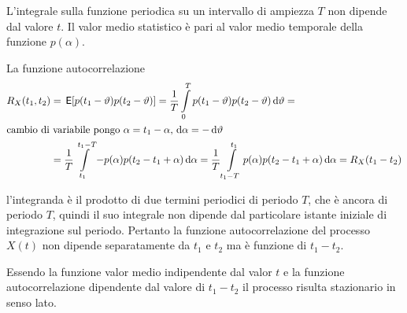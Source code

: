L'integrale sulla funzione periodica su un intervallo di ampiezza $T$ non dipende dal valore $t$. Il valor medio statistico è pari al valor medio temporale della funzione $p(\alpha)$.

La funzione autocorrelazione
\begin{align*}
	R_X(t_1,t_2)&=\,{\operatorname{\mathsf{E}}}\!\left[{p(t_1-\vartheta)p(t_2-\vartheta)}\right]=\frac{1}{T}\int\limits_{0}^{T}{p(t_1-\vartheta)p(t_2-\vartheta)}{\,\mathop{}\!\mathrm{d}{\vartheta}}=\\
\intertext{cambio di variabile pongo $\alpha=t_1-\alpha$, $\mathop{}\!\mathrm{d}\alpha=-\mathop{}\!\mathrm{d}\vartheta$}
	&=\frac{1}{T}\int\limits_{t_1}^{t_1-T}{-p(\alpha)p(t_2-t_1+\alpha)}{\,\mathop{}\!\mathrm{d}{\alpha}}=\frac{1}{T}\int\limits_{t_1-T}^{t_1}{p(\alpha)p(t_2-t_1+\alpha)}{\,\mathop{}\!\mathrm{d}{\alpha}}=R_X(t_1-t_2)
\end{align*}

l'integranda è il prodotto di due termini periodici di periodo $T$, che è ancora di periodo $T$, quindi il suo integrale non dipende dal particolare istante iniziale di integrazione sul periodo. Pertanto la funzione autocorrelazione del processo $X(t)$ non dipende separatamente da $t_1$ e $t_2$ ma è funzione di $t_1-t_2$.

Essendo la funzione valor medio indipendente dal valor $t$ e la funzione autocorrelazione dipendente dal valore di $t_1-t_2$ il processo risulta stazionario in senso lato.

